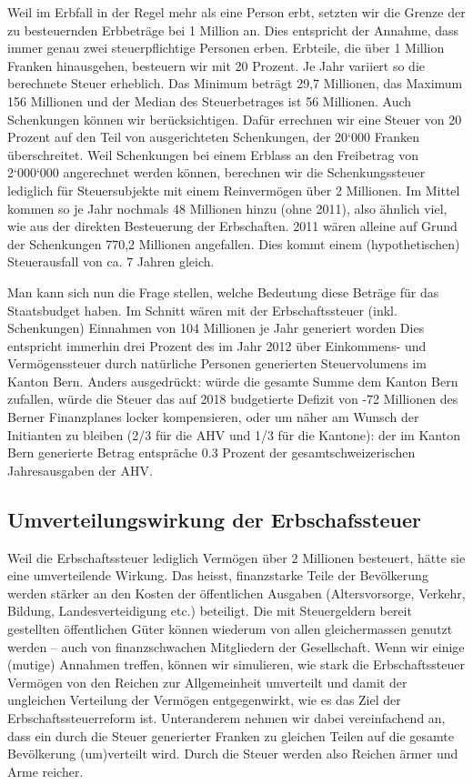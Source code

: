 \documentclass[a4paper, 12pt,liststotoc]{scrartcl}
\numberwithin{equation}{section}
\begin{document}
Weil im Erbfall in der Regel mehr als eine Person erbt, setzten wir die
Grenze der zu besteuernden Erbbeträge bei 1 Million an. Dies entspricht
der Annahme, dass immer genau zwei steuerpflichtige Personen erben.
Erbteile, die über 1 Million Franken hinausgehen, besteuern wir mit 20
Prozent. Je Jahr variiert so die berechnete Steuer erheblich. Das
Minimum beträgt 29,7 Millionen, das Maximum 156 Millionen und der Median
des Steuerbetrages ist 56 Millionen. Auch Schenkungen können wir
berücksichtigen. Dafür errechnen wir eine Steuer von 20 Prozent auf den
Teil von ausgerichteten Schenkungen, der 20`000 Franken überschreitet.
Weil Schenkungen bei einem Erblass an den Freibetrag von 2`000`000
angerechnet werden können, berechnen wir die Schenkungssteuer lediglich
für Steuersubjekte mit einem Reinvermögen über 2 Millionen. Im Mittel
kommen so je Jahr nochmals 48 Millionen hinzu (ohne 2011), also ähnlich
viel, wie aus der direkten Besteuerung der Erbschaften. 2011 wären
alleine auf Grund der Schenkungen 770,2 Millionen angefallen. Dies kommt
einem (hypothetischen) Steuerausfall von ca. 7 Jahren gleich.

Man kann sich nun die Frage stellen, welche Bedeutung diese Beträge für
das Staatsbudget haben. Im Schnitt wären mit der Erbschaftssteuer (inkl.
Schenkungen) Einnahmen von 104 Millionen je Jahr generiert worden Dies
entspricht immerhin drei Prozent des im Jahr 2012 über Einkommens- und
Vermögenssteuer durch natürliche Personen generierten Steuervolumens im
Kanton Bern. Anders ausgedrückt: würde die gesamte Summe dem Kanton Bern
zufallen, würde die Steuer das auf 2018 budgetierte Defizit von -72
Millionen des Berner Finanzplanes locker kompensieren, oder um näher am
Wunsch der Initianten zu bleiben (2/3 für die AHV und 1/3 für die
Kantone): der im Kanton Bern generierte Betrag entspräche 0.3 Prozent
der gesamtschweizerischen Jahresausgaben der AHV.

\subsection{Umverteilungswirkung der
Erbschafssteuer}\label{umverteilungswirkung-der-erbschafssteuer}

Weil die Erbschaftssteuer lediglich Vermögen über 2 Millionen besteuert,
hätte sie eine umverteilende Wirkung. Das heisst, finanzstarke Teile der
Bevölkerung werden stärker an den Kosten der öffentlichen Ausgaben
(Altersvorsorge, Verkehr, Bildung, Landesverteidigung etc.) beteiligt.
Die mit Steuergeldern bereit gestellten öffentlichen Güter können
wiederum von allen gleichermassen genutzt werden -- auch von
finanzschwachen Mitgliedern der Gesellschaft. Wenn wir einige (mutige)
Annahmen treffen, können wir simulieren, wie stark die Erbschaftssteuer
Vermögen von den Reichen zur Allgemeinheit umverteilt und damit der
ungleichen Verteilung der Vermögen entgegenwirkt, wie es das Ziel der
Erbschaftssteuerreform ist. Unteranderem nehmen wir dabei vereinfachend
an, dass ein durch die Steuer generierter Franken zu gleichen Teilen auf
die gesamte Bevölkerung (um)verteilt wird. Durch die Steuer werden also
Reichen ärmer und Arme reicher.
\end{document}
